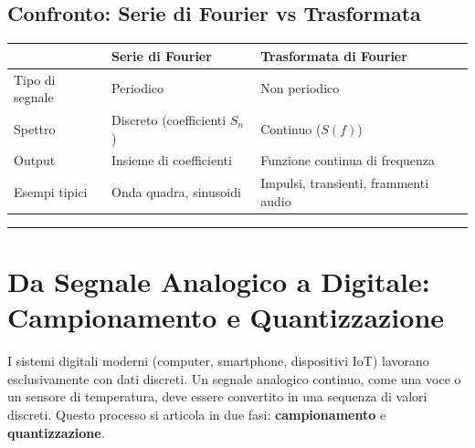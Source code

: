 \documentclass[
  italian,
  openany]{book}
\newcounter{none} %
\begin{document}
\subsection{Confronto: Serie di Fourier vs
Trasformata}\label{confronto-serie-di-fourier-vs-trasformata}

{\def\LTcaptype{none} %
\begin{longtable}[]{@{}
  >{\raggedright\arraybackslash}p{}
  >{\raggedright\arraybackslash}p{}
  >{\raggedright\arraybackslash}p{}@{}}
\toprule\noalign{}
\begin{minipage}[b]{\linewidth}\raggedright
\end{minipage} & \begin{minipage}[b]{\linewidth}\raggedright
Serie di Fourier
\end{minipage} & \begin{minipage}[b]{\linewidth}\raggedright
Trasformata di Fourier
\end{minipage} \\
\midrule\noalign{}
\endhead
\bottomrule\noalign{}
\endlastfoot
Tipo di segnale & Periodico & Non periodico \\
Spettro & Discreto (coefficienti \(S_n\)) & Continuo (\(S(f)\)) \\
Output & Insieme di coefficienti & Funzione continua di frequenza \\
Esempi tipici & Onda quadra, sinusoidi & Impulsi, transienti, frammenti
audio \\
\end{longtable}
}

\begin{center}\rule{0.5\linewidth}{0.5pt}\end{center}

\section{Da Segnale Analogico a Digitale: Campionamento e
Quantizzazione}\label{da-segnale-analogico-a-digitale-campionamento-e-quantizzazione}

I sistemi digitali moderni (computer, smartphone, dispositivi IoT)
lavorano esclusivamente con dati discreti. Un segnale analogico
continuo, come una voce o un sensore di temperatura, deve essere
convertito in una sequenza di valori discreti. Questo processo si
articola in due fasi: \textbf{campionamento} e \textbf{quantizzazione}.
\end{document}

